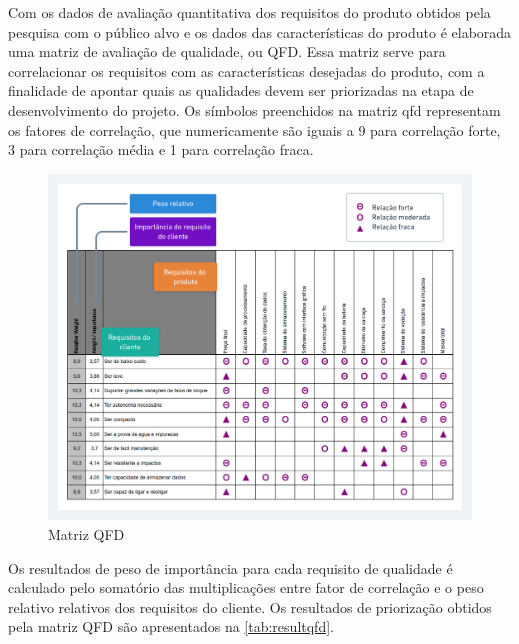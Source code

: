 Com os dados de avaliação quantitativa dos requisitos do produto obtidos pela pesquisa com o público alvo e os dados das características do produto é elaborada uma matriz de  avaliação de qualidade, ou QFD.
Essa matriz serve para correlacionar os requisitos com as características desejadas do produto, com a finalidade de apontar quais as qualidades devem ser priorizadas na etapa de desenvolvimento do projeto.
Os símbolos preenchidos na matriz qfd representam os fatores de correlação, que numericamente são iguais a 9 para correlação forte, 3 para correlação média e 1 para correlação fraca.

\begin{figure}[htb]
	\caption{\label{fig:2032} Matriz QFD}
	\begin{center}
		\includegraphics[width=\textwidth]{pictures/2032.png}
	\end{center}
\end{figure}

Os resultados de peso de importância para cada requisito de qualidade é calculado pelo somatório das multiplicações entre fator de correlação e o peso relativo relativos dos requisitos do cliente.
Os resultados de priorização obtidos pela matriz QFD são apresentados na \autoref{tab:resultqfd}.

